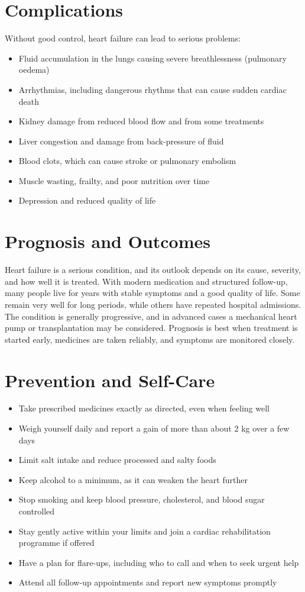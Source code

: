 \section*{Complications}
Without good control, heart failure can lead to serious problems:
\begin{itemize}
    \item Fluid accumulation in the lungs causing severe breathlessness (pulmonary oedema)
    \item Arrhythmias, including dangerous rhythms that can cause sudden cardiac death
    \item Kidney damage from reduced blood flow and from some treatments
    \item Liver congestion and damage from back-pressure of fluid
    \item Blood clots, which can cause stroke or pulmonary embolism
    \item Muscle wasting, frailty, and poor nutrition over time
    \item Depression and reduced quality of life
\end{itemize}

\section*{Prognosis and Outcomes}
Heart failure is a serious condition, and its outlook depends on its cause, severity, and how well it is treated. With modern medication and structured follow-up, many people live for years with stable symptoms and a good quality of life. Some remain very well for long periods, while others have repeated hospital admissions. The condition is generally progressive, and in advanced cases a mechanical heart pump or transplantation may be considered. Prognosis is best when treatment is started early, medicines are taken reliably, and symptoms are monitored closely.

\section*{Prevention and Self-Care}
\begin{itemize}
    \item Take prescribed medicines exactly as directed, even when feeling well
    \item Weigh yourself daily and report a gain of more than about 2 kg over a few days
    \item Limit salt intake and reduce processed and salty foods
    \item Keep alcohol to a minimum, as it can weaken the heart further
    \item Stop smoking and keep blood pressure, cholesterol, and blood sugar controlled
    \item Stay gently active within your limits and join a cardiac rehabilitation programme if offered
    \item Have a plan for flare-ups, including who to call and when to seek urgent help
    \item Attend all follow-up appointments and report new symptoms promptly
\end{itemize}

